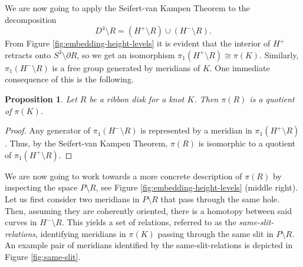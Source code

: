 \documentclass{article}
\newtheorem{proposition}[theorem]{Proposition}
\theoremstyle{definition}
\begin{document}
We are now going to apply the Seifert-van Kampen Theorem to the decomposition 
$$D^4 \setminus R = (H^+ \setminus R) \cup (H^- \setminus R).$$ From Figure \ref{fig:embedding-height-levels} it is evident that the interior of $H^+$ retracts onto $S^3 \setminus \partial R$, so we get an isomorphism $\pi_1(H^+ \setminus R) \cong \pi(K)$. Similarly, $\pi_1(H^- \setminus R)$ is a free group generated by meridians of $K$. One immediate consequence of this is the following.

\begin{proposition}
Let $R$ be a ribbon disk for a knot $K$. Then $\pi(R)$ is a quotient of $\pi(K)$.
\end{proposition}

\begin{proof}
Any generator of $\pi_1(H^- \setminus R)$ is represented by a meridian in $\pi_1(H^+ \setminus R)$. Thus, by the Seifert-van Kampen Theorem, $\pi(R)$ is isomorphic to a quotient of $\pi_1(H^+ \setminus R)$.
\end{proof}

We are now going to work towards a more concrete description of $\pi(R)$ by inspecting the space $P \setminus R$, see Figure \ref{fig:embedding-height-levels} (middle right). Let us first consider two meridians in $P \setminus R$ that pass through the same hole. Then, assuming they are coherently oriented, there is a homotopy between said curves in $H^- \setminus R$. This yields a set of relations, referred to as the \textit{same-slit-relations}, identifying meridians in $\pi(K)$ passing through the same slit in $P \setminus R$. An example pair of meridians identified by the same-slit-relations is depicted in Figure \ref{fig:same-slit}.
\end{document}
